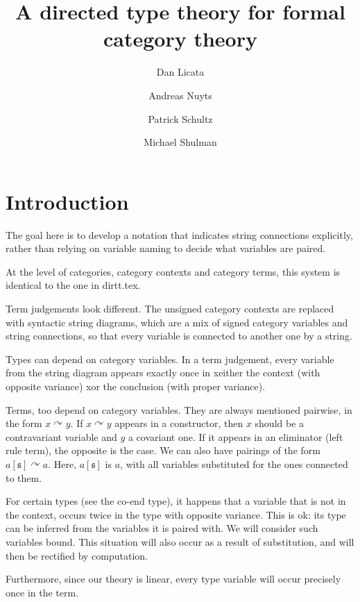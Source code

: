 \documentclass{article}
\title{A directed type theory for formal category theory}
\author{Dan Licata \and Andreas Nuyts \and Patrick Schultz \and Michael Shulman}
\newcommand{\strs}[1]{\mathfrak{#1}}
\newcommand{\strto}{\curvearrowright}
\begin{document}
\maketitle

\section{Introduction}
The goal here is to develop a notation that indicates string connections explicitly, rather than relying on variable naming to decide what variables are paired.

At the level of categories, category contexts and category terms, this system is identical to the one in dirtt.tex.

Term judgements look different. The unsigned category contexts are replaced with syntactic string diagrams, which are a mix of signed category variables and string connections, so that every variable is connected to another one by a string.

Types can depend on category variables. In a term judgement, every variable from the string diagram appears exactly once in xeither the context (with opposite variance) xor the conclusion (with proper variance).

Terms, too depend on category variables. They are always mentioned pairwise, in the form $x \strto y$. If $x \strto y$ appears in a constructor, then $x$ should be a contravariant variable and $y$ a covariant one. If it appears in an eliminator (left rule term), the opposite is the case. We can also have pairings of the form $a[\strs s] \strto a$. Here, $a[\strs s]$ is $a$, with all variables substituted for the ones connected to them.

For certain types (see the co-end type), it happens that a variable that is not in the context, occurs twice in the type with opposite variance. This is ok: its type can be inferred from the variables it is paired with. We will consider such variables bound. This situation will also occur as a result of substitution, and will then be rectified by computation.

Furthermore, since our theory is linear, every type variable will occur precisely once in the term.
\end{document}

